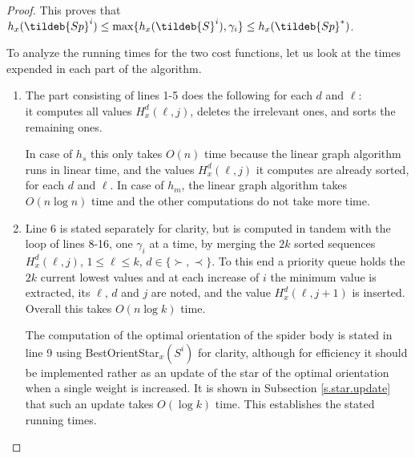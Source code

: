 \begin{proof}
This proves that $h_x(\tildeb{Sp}^i)\leq \max\{h_x(\tildeb{S}^i),\gamma_i \}\leq h_x(\tildeb{Sp}^*)$.

To analyze the running times for the two cost functions, let us look at the times expended
in each part of the algorithm.
\begin{enumerate}
	\item The part consisting of lines 1-5 does the following for each $d$ and $\ell$:\\
	it computes all values $H^{d}_x(\ell,j)$, deletes the irrelevant ones, and sorts the remaining ones. 
	 
	 In case of $h_s$ this only takes $O(n)$ time because the linear graph algorithm 
	 runs in linear time, and the values $H^{d}_x(\ell,j)$ it computes are already sorted, 
	 for each  $d$ and $\ell$. In case of $h_m$, the linear graph algorithm takes $O(n\log n)$
	 time and the other computations do not take more time.
	\item Line 6 is stated separately for clarity, but is computed in tandem with the loop
	of lines 8-16, one $\gamma_i$ at a time, by merging the $2k$ sorted 
	sequences $H^{d}_x(\ell,j)$, $1\leq \ell \leq k$, $d \in \{\succ,\prec\}$. 
    To this end a priority queue holds the  $2k$ current lowest values and at each increase  
    of $i$ the minimum value is extracted, its  $\ell$, $d$ and $j$ are noted, and 
    the value $H^{d}_x(\ell,j+1)$ is inserted. Overall this takes $O(n \log k)$ time.
    
    The computation of the optimal orientation of the spider body is stated in line 9
    using BestOrientStar$_x(S^i)$ for
    clarity, although for efficiency it should be implemented rather as an update of the star
    of the optimal orientation when a single weight is increased. It is shown in Subsection
    \ref{s.star.update} that such an update takes $O(\log k)$ time. This
    establishes the stated running times.
\end{enumerate}

\end{proof}

